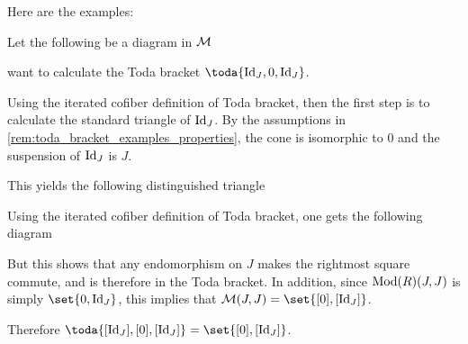 Here are the examples:

\begin{example}
	Let the following be a diagram in \( {\mathcal{M}} \)
	\begin{center}
	\end{center}
	want to calculate the Toda bracket \( \toda{\Id_J, 0, \Id_J} \).

	Using the iterated cofiber definition of Toda bracket, then the first step is to calculate the standard triangle of \( \operatorname{Id}_J \). By the assumptions in \autoref{rem:toda_bracket_examples_properties}, the cone is isomorphic to \( 0 \) and the suspension of \( \operatorname{Id}_J \) is \( J \).

	This yields the following distinguished triangle
	\begin{center}
	\end{center}

	Using the iterated cofiber definition of Toda bracket, one gets the following diagram
	\begin{center}
	\end{center}

	But this shows that any endomorphism on \( J \) makes the rightmost square commute, and is therefore in the Toda bracket. In addition, since \( \operatorname{Mod}(R)(J, J) \) is simply \( \set{0, \Id_J} \), this implies that \( \Mc(J, J) = \set{[0], [\Id_J]} \).

	Therefore \( \toda{[\Id_J], [0], [\Id_J]} = \set{[0], [\Id_J]} \). 
\end{example}

